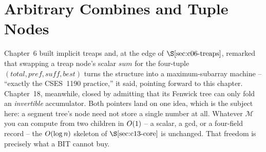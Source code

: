 \section{Arbitrary Combines and Tuple Nodes}\label{sec:c13-combine}

\begin{previouslybox}
Chapter~6 built implicit treaps and, at the edge of \(\secref{c06-treaps}\),
remarked that swapping a treap node's scalar \(\mathit{sum}\) for the
four-tuple \((\mathit{total},\mathit{pref},\mathit{suff},\mathit{best})\) turns
the structure into a maximum-subarray machine -- ``exactly the CSES~1190
practice,'' it said, pointing forward to this chapter.  Chapter~18, meanwhile,
closed by admitting that its Fenwick tree can only fold an \emph{invertible}
accumulator.  Both pointers land on one idea, which is the subject here: a
segment tree's node need not store a single number at all.  Whatever
\(\mathcal{M}\) you can compute from two children in \(O(1)\) -- a scalar, a
gcd, or a four-field record -- the \(O(\log n)\) skeleton of
\(\secref{c13-core}\) is unchanged.  That freedom is precisely what a BIT
cannot buy.
\end{previouslybox}

